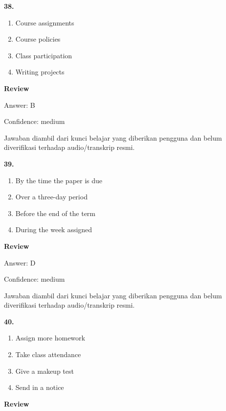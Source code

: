 \documentclass[12pt]{article}
\begin{document}
\noindent\textbf{38.}
\begin{enumerate}[label=(\Alph*),leftmargin=*,itemsep=0.2em]
\item Course assignments
\item Course policies
\item Class participation
\item Writing projects
\end{enumerate}
\par
\begingroup
\setlength{\parskip}{0pt}
\setlength{\parindent}{0pt}
\textbf{Review}\par
Answer: B\par
Confidence: medium\par
Jawaban diambil dari kunci belajar yang diberikan pengguna dan belum diverifikasi terhadap audio/transkrip resmi.\par
\endgroup
\par
\vspace{0.25\baselineskip}
\noindent\textbf{39.}
\begin{enumerate}[label=(\Alph*),leftmargin=*,itemsep=0.2em]
\item By the time the paper is due
\item Over a three-day period
\item Before the end of the term
\item During the week assigned
\end{enumerate}
\par
\begingroup
\setlength{\parskip}{0pt}
\setlength{\parindent}{0pt}
\textbf{Review}\par
Answer: D\par
Confidence: medium\par
Jawaban diambil dari kunci belajar yang diberikan pengguna dan belum diverifikasi terhadap audio/transkrip resmi.\par
\endgroup
\par
\vspace{0.25\baselineskip}
\noindent\textbf{40.}
\begin{enumerate}[label=(\Alph*),leftmargin=*,itemsep=0.2em]
\item Assign more homework
\item Take class attendance
\item Give a makeup test
\item Send in a notice
\end{enumerate}
\par
\begingroup
\setlength{\parskip}{0pt}
\setlength{\parindent}{0pt}
\textbf{Review}\par
\end{document}
